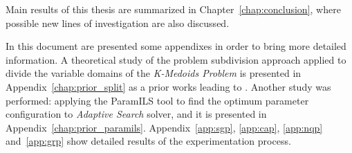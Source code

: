 Main results of this thesis are summarized in Chapter~\ref{chap:conclusion}, where possible new lines of investigation are also discussed.

In this document are presented some appendixes in order to bring more detailed information. A theoretical study of the problem subdivision approach applied to divide the variable domains of the \textit{K-Medoids Problem} is presented in Appendix~\ref{chap:prior_split} as a prior works leading to \posl{}. Another study was performed: applying the {\sc ParamILS} tool to find the optimum parameter configuration to \textit{Adaptive Search} solver, and it is presented in Appendix~\ref{chap:prior_paramils}. Appendix~\ref{app:sgp}, \ref{app:cap}, \ref{app:nqp} and~\ref{app:grp} show detailed results of the experimentation process.